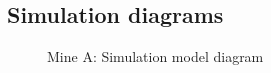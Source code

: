 \begin{appendices}
\chapter{Simulation diagrams}
\newpage
	
	\begin{figure}[h!]
		\centering
		\caption{Mine A: Simulation model diagram}
		\label{fig: BEET Baseline model}
	\end{figure}


\end{appendices}
